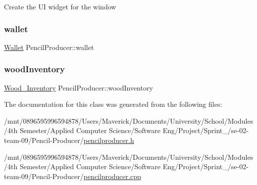 Create the UI widget for the window \mbox{\label{classPencilProducer_a9ce8a9dbf5deb875692d5dcec4374e2d}} 
\subsubsection{\texorpdfstring{wallet}{wallet}}
{\footnotesize\ttfamily \hyperlink{classWallet}{Wallet} Pencil\+Producer\+::wallet\hspace{0.3cm}{\ttfamily [private]}}

\mbox{\label{classPencilProducer_ac0454fe420705b3e3e922661e89ecee0}} 
\subsubsection{\texorpdfstring{wood\+Inventory}{woodInventory}}
{\footnotesize\ttfamily \hyperlink{classWood__Inventory}{Wood\+\_\+\+Inventory} Pencil\+Producer\+::wood\+Inventory\hspace{0.3cm}{\ttfamily [private]}}



The documentation for this class was generated from the following files\+:\begin{DoxyCompactItemize}
\item 
/mnt/0896595996594878/\+Users/\+Maverick/\+Documents/\+University/\+School/\+Modules/4th Semester/\+Applied Computer Science/\+Software Eng/\+Project/\+Sprint\+\_/se-\/02-\/team-\/09/\+Pencil-\/\+Producer/\hyperlink{pencilproducer_8h}{pencilproducer.\+h}\item 
/mnt/0896595996594878/\+Users/\+Maverick/\+Documents/\+University/\+School/\+Modules/4th Semester/\+Applied Computer Science/\+Software Eng/\+Project/\+Sprint\+\_/se-\/02-\/team-\/09/\+Pencil-\/\+Producer/\hyperlink{pencilproducer_8cpp}{pencilproducer.\+cpp}\end{DoxyCompactItemize}
